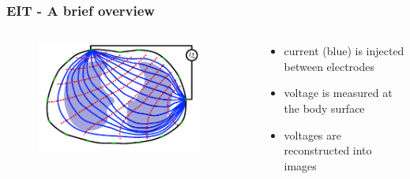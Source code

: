 \documentclass[10pt,    %
    english,            %
    xcolor=table,       %
    envcountsect,        %
    aspectratio=1610
]{beamer}
\begin{document}
\begin{frame}
\frametitle{EIT - A brief overview}    
\begin{columns}[c]
	\begin{column}{0.5\textwidth}
		\begin{figure}[H]
			\centering
			\includegraphics[width=0.9\textwidth]{current_density_voltage.pdf}
		\end{figure}
	\end{column}
	\begin{column}{0.5\textwidth}
		\begin{itemize}
			\item current (blue) is injected between electrodes
			\item \alert{voltage is measured at the body surface}
			\item voltages are reconstructed into images
		\end{itemize}
	\end{column}
\end{columns}
\end{frame}
\end{document}
